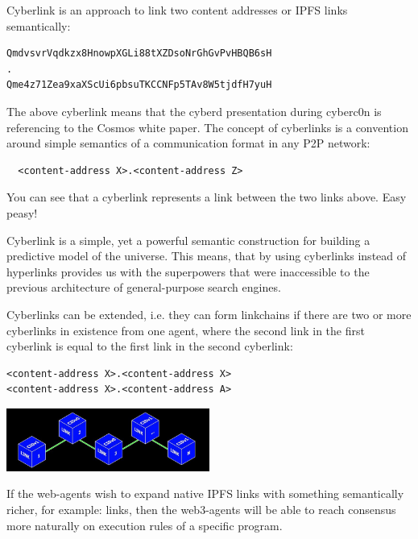 \documentclass[8pt,oneside]{amsart}
\newcommand{\linkred}[2]{\href{#1}{\color{red}{#2}}}
\newcommand{\code}[1]{{\PlayBold #1}}
\newenvironment{Figure}
  {\par\medskip\noindent\minipage{\linewidth}}
  {\endminipage\par\medskip}
\begin{document}
\begin{Abstract}
\code{Cyberlink} is an approach to link two content addresses or \code{IPFS links} semantically:

\begin{lstlisting}
QmdvsvrVqdkzx8HnowpXGLi88tXZDsoNrGhGvPvHBQB6sH
.
Qme4z71Zea9xaXScUi6pbsuTKCCNFp5TAv8W5tjdfH7yuH
\end{lstlisting}

The above cyberlink means that the cyberd presentation during cyberc0n is referencing to the Cosmos white paper. The concept of cyberlinks is a convention around simple semantics of a communication format in any P2P network:

\begin{lstlisting}
  <content-address X>.<content-address Z>
\end{lstlisting}

You can see that a cyberlink represents a link between the two links above. Easy peasy!

Cyberlink is a simple, yet a powerful semantic construction for building a predictive model of the universe. This means, that by using cyberlinks instead of hyperlinks provides us with the superpowers that were inaccessible to the previous architecture of general-purpose search engines.

Cyberlinks can be extended, i.e. they can form linkchains if there are two or more cyberlinks in existence from one agent, where the second link in the first cyberlink is equal to the first link in the second cyberlink:

\begin{lstlisting}
<content-address X>.<content-address X>
<content-address X>.<content-address A>
\end{lstlisting}

\begin{Figure}
    \centering
    \includegraphics[width=0.5\textwidth]{linkchain.jpg}
\end{Figure}

If the web-agents wish to expand native \code{IPFS links} with something semantically richer, for example:
\linkred{https://github.com/cybercongress/cyb/blob/dev/docs/dura.md}{DURA}
links, then the web3-agents will be able to reach consensus more naturally on execution rules of a specific program.


\end{Abstract}
\end{document}

